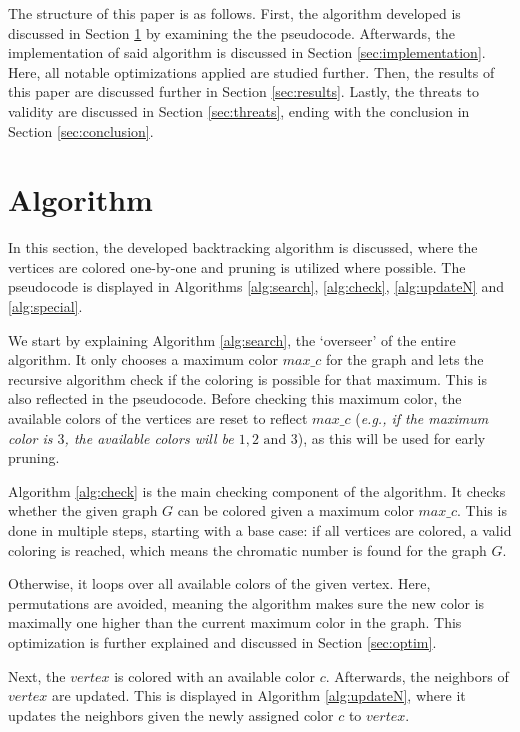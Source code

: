 \documentclass{article}
\begin{document}
The structure of this paper is as follows. First, the algorithm developed is discussed in Section \ref{sec:alg} by examining the the pseudocode. Afterwards, the implementation of said algorithm is discussed in Section \ref{sec:implementation}. Here, all notable optimizations applied are studied further. Then, the results of this paper are discussed further in Section \ref{sec:results}. Lastly, the threats to validity are discussed in Section \ref{sec:threats}, ending with the conclusion in Section \ref{sec:conclusion}.


\section{Algorithm}
\label{sec:alg}

In this section, the developed backtracking algorithm is discussed, where the vertices are colored one-by-one and pruning is utilized where possible. The pseudocode is displayed in Algorithms \ref{alg:search}, \ref{alg:check}, \ref{alg:updateN} and \ref{alg:special}. 


We start by explaining Algorithm \ref{alg:search}, the `overseer' of the entire algorithm. It only chooses a maximum color $max\_c$ for the graph and lets the recursive algorithm check if the coloring is possible for that maximum. This is also reflected in the pseudocode. 
Before checking this maximum color, the available colors of the vertices are reset to reflect $max\_c$ (\textit{e.g., if the maximum color is $3$, the available colors will be ${1, 2 \text{ and } 3}$}), as this will be used for early pruning.

Algorithm \ref{alg:check} is the main checking component of the algorithm. It checks whether the given graph $G$ can be colored given a maximum color $max\_c$. This is done in multiple steps, starting with a base case: if all vertices are colored, a valid coloring is reached, which means the chromatic number is found for the graph $G$. 

Otherwise, it loops over all available colors of the given vertex. Here, permutations are avoided, meaning the algorithm makes sure the new color is maximally one higher than the current maximum color in the graph. This optimization is further explained and discussed in Section \ref{sec:optim}.

Next, the $vertex$ is colored with an available color $c$. 
Afterwards, the neighbors of $vertex$ are updated. This is displayed in Algorithm \ref{alg:updateN}, where it updates the neighbors given the newly assigned color $c$ to $vertex$. 
\end{document}
